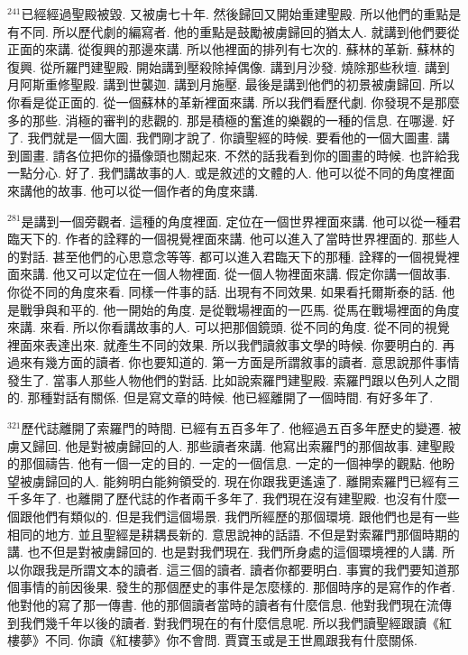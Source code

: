 \documentclass{book}
\begin{document}
$^{241}$已經經過聖殿被毀.
又被虜七十年.
然後歸回又開始重建聖殿.
所以他們的重點是有不同.
所以歷代劇的編寫者.
他的重點是鼓勵被虜歸回的猶太人.
就講到他們要從正面的來講.
從復興的那邊來講.
所以他裡面的排列有七次的.
蘇林的革新.
蘇林的復興.
從所羅門建聖殿.
開始講到壓殺除掉偶像.
講到月沙發.
燒除那些秋壇.
講到月阿斯重修聖殿.
講到世襲迦.
講到月施壓.
最後是講到他們的初景被虜歸回.
所以你看是從正面的.
從一個蘇林的革新裡面來講.
所以我們看歷代劇.
你發現不是那麼多的那些.
消極的審判的悲觀的.
那是積極的奮進的樂觀的一種的信息.
在哪邊.
好了.
我們就是一個大圖.
我們剛才說了.
你讀聖經的時候.
要看他的一個大圖畫.
講到圖畫.
請各位把你的攝像頭也關起來.
不然的話我看到你的圖畫的時候.
也許給我一點分心.
好了.
我們講故事的人.
或是敘述的文體的人.
他可以從不同的角度裡面來講他的故事.
他可以從一個作者的角度來講.

$^{281}$是講到一個旁觀者.
這種的角度裡面.
定位在一個世界裡面來講.
他可以從一種君臨天下的.
作者的詮釋的一個視覺裡面來講.
他可以進入了當時世界裡面的.
那些人的對話.
甚至他們的心思意念等等.
都可以進入君臨天下的那種.
詮釋的一個視覺裡面來講.
他又可以定位在一個人物裡面.
從一個人物裡面來講.
假定你講一個故事.
你從不同的角度來看.
同樣一件事的話.
出現有不同效果.
如果看托爾斯泰的話.
他是戰爭與和平的.
他一開始的角度.
是從戰場裡面的一匹馬.
從馬在戰場裡面的角度來講.
來看.
所以你看講故事的人.
可以把那個鏡頭.
從不同的角度.
從不同的視覺裡面來表達出來.
就產生不同的效果.
所以我們讀敘事文學的時候.
你要明白的.
再過來有幾方面的讀者.
你也要知道的.
第一方面是所謂敘事的讀者.
意思說那件事情發生了.
當事人那些人物他們的對話.
比如說索羅門建聖殿.
索羅門跟以色列人之間的.
那種對話有關係.
但是寫文章的時候.
他已經離開了一個時間.
有好多年了.

$^{321}$歷代誌離開了索羅門的時間.
已經有五百多年了.
他經過五百多年歷史的變遷.
被虜又歸回.
他是對被虜歸回的人.
那些讀者來講.
他寫出索羅門的那個故事.
建聖殿的那個禱告.
他有一個一定的目的.
一定的一個信息.
一定的一個神學的觀點.
他盼望被虜歸回的人.
能夠明白能夠領受的.
現在你跟我更遙遠了.
離開索羅門已經有三千多年了.
也離開了歷代誌的作者兩千多年了.
我們現在沒有建聖殿.
也沒有什麼一個跟他們有類似的.
但是我們這個場景.
我們所經歷的那個環境.
跟他們也是有一些相同的地方.
並且聖經是耕耦長新的.
意思說神的話語.
不但是對索羅門那個時期的講.
也不但是對被虜歸回的.
也是對我們現在.
我們所身處的這個環境裡的人講.
所以你跟我是所謂文本的讀者.
這三個的讀者.
讀者你都要明白.
事實的我們要知道那個事情的前因後果.
發生的那個歷史的事件是怎麼樣的.
那個時序的是寫作的作者.
他對他的寫了那一傳書.
他的那個讀者當時的讀者有什麼信息.
他對我們現在流傳到我們幾千年以後的讀者.
對我們現在的有什麼信息呢.
所以我們讀聖經跟讀《紅樓夢》不同.
你讀《紅樓夢》你不會問.
賈寶玉或是王世鳳跟我有什麼關係.
\end{document}

